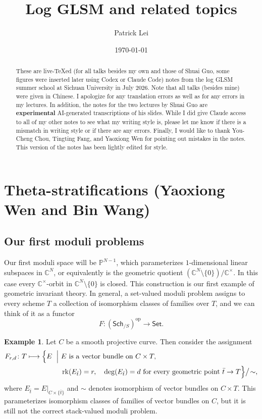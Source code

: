 \documentclass{amsart}
\title{Log GLSM and related topics}
\author{Patrick Lei}
\date{\today}
\theoremstyle{definition}
\newtheorem{exm}[thm]{Example}
\theoremstyle{remark}
\theoremstyle{plain}
\theoremstyle{definition}
\theoremstyle{remark}
\newcommand{\C}{\mathbb{C}}
\renewcommand{\P}{\mathbb{P}}
\newcommand{\mr}[1]{\mathrm{#1}}
\newcommand{\ms}[1]{\mathsf{#1}}
\newcommand{\1}{\mathbf{1}}
\newcommand{\2}{\mathbf{2}}
\newcommand{\3}{\mathbf{3}}
\begin{document}
    
\begin{abstract}
    These are live-TeXed (for all talks besides my own and those of Shuai Guo, some figures were inserted later using Codex or Claude Code) notes from the log GLSM summer school at Sichuan University in July 2026. Note that all talks (besides mine) were given in Chinese. I apologize for any translation errors as well as for any errors in my lectures. In addition, the notes for the two lectures by Shuai Guo are \textbf{experimental} AI-generated transcriptions of his slides. While I did give Claude access to all of my other notes to see what my writing style is, please let me know if there is a mismatch in writing style or if there are any errors. Finally, I would like to thank You-Cheng Chou, Tingting Fang, and Yaoxiong Wen for pointing out mistakes in the notes. This version of the notes has been lightly edited for style.
\end{abstract}

\maketitle

\tableofcontents

\section{Theta-stratifications (Yaoxiong Wen and Bin Wang)}%
\label{sec:Theta-stratifications}

\subsection{Our first moduli problems}%
\label{sub:Our first moduli problem}

Our first moduli space will be \(\P^{N-1}\), which parameterizes \(1\)-dimensional linear subspaces in \(\C^N\), or equivalently is the geometric quotient \((\C^N \setminus \{0\}) / \C^{\times}\). In this case every \(\C^{\times}\)-orbit in \(\C^N\setminus\{0\}\) is closed. This construction is our first example of geometric invariant theory. In general, a set-valued moduli problem assigns to every scheme \(T\) a collection of isomorphism classes of families over \(T\), and we can think of it as a functor
\[ F \colon (\ms{Sch}_{/S})^{\mr{op}} \to \ms{Set}. \]

\begin{exm}
    Let \(C\) be a smooth projective curve. Then consider the assignment
    \[
    \begin{aligned}
        F_{r,d}\colon T \longmapsto
        \Bigl\{
        E \ \Bigm|\ &
        E \text{ is a vector bundle on } C\times T,\\
        &\operatorname{rk}(E_{\bar t})=r,\quad \deg(E_{\bar t})=d
        \text{ for every geometric point } \bar t\to T
        \Bigr\}\big/\!\sim,
    \end{aligned}
    \]
    where \(E_{\bar t}=E|_{C\times\{\bar t\}}\) and \(\sim\) denotes isomorphism of vector bundles on \(C\times T\). This parameterizes isomorphism classes of families of vector bundles on \(C\), but it is still not the correct stack-valued moduli problem.
\end{exm}
\end{document}
